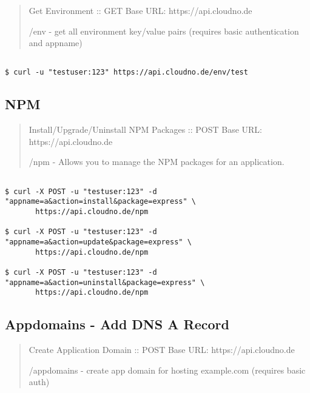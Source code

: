 \begin{quote}

Get Environment :: GET
Base URL: https:/\slash api.cloudno.de

\slash env - get all environment key\slash value pairs (requires basic authentication and appname)
\end{quote}

\begin{adjustwidth}{2.5em}{2.5em}
\begin{verbatim}

$ curl -u "testuser:123" https://api.cloudno.de/env/test

\end{verbatim}
\end{adjustwidth}



\subsection{NPM}
\label{npm}

\begin{quote}

Install\slash Upgrade\slash Uninstall NPM Packages :: POST
Base URL: https:/\slash api.cloudno.de

\slash npm - Allows you to manage the NPM packages for an application.
\end{quote}

\begin{adjustwidth}{2.5em}{2.5em}
\begin{verbatim}

$ curl -X POST -u "testuser:123" -d "appname=a&action=install&package=express" \
       https://api.cloudno.de/npm

$ curl -X POST -u "testuser:123" -d "appname=a&action=update&package=express" \
       https://api.cloudno.de/npm

$ curl -X POST -u "testuser:123" -d "appname=a&action=uninstall&package=express" \
       https://api.cloudno.de/npm

\end{verbatim}
\end{adjustwidth}



\subsection{Appdomains - Add DNS A Record}
\label{appdomains-adddnsarecord}

\begin{quote}

Create Application Domain :: POST
Base URL: https:/\slash api.cloudno.de

\slash appdomains - create app domain for hosting example.com (requires basic auth)
\end{quote}

